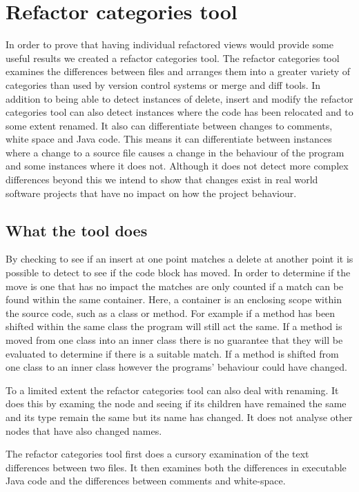 
\chapter{Refactor categories tool}
In order to prove that having individual refactored views would provide some useful results we created a refactor categories tool. The refactor categories tool examines the differences between files and arranges them into a greater variety of categories than used by version control systems or merge and diff tools.  In addition to being able to detect instances of delete, insert and modify the refactor categories tool can also detect instances where the code has been relocated and to some extent renamed.  It also can differentiate between changes to comments, white space and Java code. This means it can differentiate between instances where a change to a source file causes a change in the behaviour of the program and some instances where it does not. Although it does not detect more complex differences beyond this we intend to show that changes exist in real world software projects that have no impact on how the project behaviour.



\section{What the tool does}

By checking to see if an insert at one point matches a delete at another point it is possible to detect to see if the code block has moved. In order to determine if the move is one that has no impact the matches are only counted if a match can be found within the same container.  Here, a container is an enclosing scope within the source code, such as a class or method. For example if a method has been shifted within the same class the program will still act the same.  If a method is moved from one class into an inner class there is no guarantee that they will be evaluated to determine if there is a suitable match.  If a method is shifted from one class to an inner class however the programs' behaviour could have changed.

To a limited extent the refactor categories tool can also deal with renaming. It does this by examing the node and seeing if its children have remained the same and its type remain the same but its name has changed. It does not analyse other nodes that have also changed names.

The refactor categories tool first does a cursory examination of the text differences between two files. It then examines both the differences in executable Java code and the differences between comments and white-space. 



